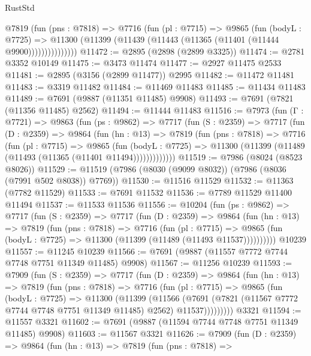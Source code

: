 \begin{lexlean}{RustStd}
\begin{coremodule}
              @7819
                (fun (pns : @7818) =>
                @7716
                  (fun (pl : @7715) =>
                  @9865
                    (fun (bodyL : @7725) =>
                    @11300 (@11399 (@11439 (@11443 (@11365 (@11401 (@11444 @9900)))))))))))))))
@11472 := @2895 (@2898 (@2899 @3325))
@11474 := @2781 @3352 @10149
@11475 := @3473 @11474
@11477 := @2927 @11475 @2533
@11481 := @2895 (@3156 (@2899 @11477)) @2995
@11482 := @11472 @11481
@11483 := @3319 @11482
@11484 := @11469 @11483
@11485 := @11434 @11483
@11489 := @7691 (@9887 (@11351 @11485) @9908)
@11493 := @7691 (@7821 (@11356 @11485) @2562)
@11494 := @11444 @11483
@11516 := @7973
    (fun (Γ : @7721) =>
    @9863
      (fun (ps : @9862) =>
      @7717
        (fun (S : @2359) =>
        @7717
          (fun (D : @2359) =>
          @9864
            (fun (hn : @13) =>
            @7819
              (fun (pns : @7818) =>
              @7716
                (fun (pl : @7715) =>
                @9865
                  (fun (bodyL : @7725) =>
                  @11300 (@11399 (@11489 (@11493 (@11365 (@11401 @11494)))))))))))))
@11519 := @7986 (@8024 (@8523 @8026))
@11529 := @11519 (@7986 (@8030 (@9099 @8032)) (@7986 (@8036 (@7991 @502 @8038)) @7769))
@11530 := @11516 @11529
@11532 := @11363 (@7782 @11529)
@11533 := @7691 @11532
@11536 := @7789 @11529 @11400 @11494
@11537 := @11533 @11536
@11556 := @10204
    (fun (ps : @9862) =>
    @7717
      (fun (S : @2359) =>
      @7717
        (fun (D : @2359) =>
        @9864
          (fun (hn : @13) =>
          @7819
            (fun (pns : @7818) =>
            @7716
              (fun (pl : @7715) =>
              @9865 (fun (bodyL : @7725) => @11300 (@11399 (@11489 (@11493 @11537))))))))))
    @10239
@11557 := @11245 @10239
@11566 := @7691 (@9887 (@11557 @7772 @7744 @7748 @7751 @11349 @11485) @9908)
@11567 := @11256 @10239
@11593 := @7909
    (fun (S : @2359) =>
    @7717
      (fun (D : @2359) =>
      @9864
        (fun (hn : @13) =>
        @7819
          (fun (pns : @7818) =>
          @7716
            (fun (pl : @7715) =>
            @9865
              (fun (bodyL : @7725) =>
              @11300
                (@11399
                  (@11566
                    (@7691
                      (@7821 (@11567 @7772 @7744 @7748 @7751 @11349 @11485) @2562)
                      @11537)))))))))
    @3321
@11594 := @11557 @3321
@11602 := @7691 (@9887 (@11594 @7744 @7748 @7751 @11349 @11485) @9908)
@11603 := @11567 @3321
@11626 := @7909
    (fun (D : @2359) =>
    @9864
      (fun (hn : @13) =>
      @7819
        (fun (pns : @7818) =>

\end{coremodule}
\end{lexlean}
